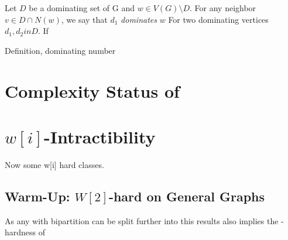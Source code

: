 Let $D$ be a dominating set of G and $w \in V(G) \setminus D$. For any neighbor $v \in D \cap N(w)$, we say that $d_1$ \textit{dominates} $w$ For two dominating vertices $d_1, d_2in D$. If 

Definition, dominating number

\section{Complexity Status of \sdom}\label{ch:complexity-status}


\section{\hmath $w[i]$-Intractibility}

Now some w[i] hard classes. 

\subsection{Warm-Up: \hmath $W[2]$-hard on General Graphs}


As any \bg with bipartition can be split further into \rpg this results also implies the \wone-hardness of \rpg

